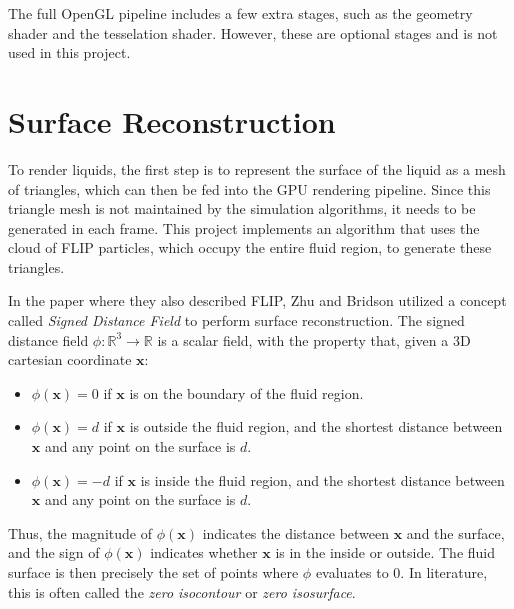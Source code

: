 The full OpenGL pipeline includes a few extra stages, such as the geometry shader and the tesselation shader. However, these are optional stages and is not used in this project. 


\section{Surface Reconstruction}
\label{section surface reconstruction}
To render liquids, the first step is to represent the surface of the liquid as a mesh of triangles, which can then be fed into the GPU rendering pipeline. Since this triangle mesh is not maintained by the simulation algorithms, it needs to be generated in each frame. This project implements an algorithm that uses the cloud of FLIP particles, which occupy the entire fluid region, to generate these triangles.

In the paper where they also described FLIP\cite{zhu2005animating}, Zhu and Bridson utilized a concept called \textit{Signed Distance Field} to perform surface reconstruction. The signed distance field $\phi : \mathbb{R} ^3 \rightarrow \mathbb{R}$  is a scalar field, with the property that, given a 3D cartesian coordinate $\textbf{x}$:
\begin{itemize}
    \item $\phi(\textbf{x}) = 0$ if $\textbf{x}$ is on the boundary of the fluid region.
    
    \item $\phi(\textbf{x}) = d$ if $\textbf{x}$ is outside the fluid region, and the shortest distance between $\textbf{x}$ and any point on the surface is $d$.
    
    \item $\phi(\textbf{x}) = -d$ if $\textbf{x}$ is inside the fluid region, and the shortest distance between $\textbf{x}$ and any point on the surface is $d$.
\end{itemize}
Thus, the magnitude of $\phi(\textbf{x})$ indicates the distance between $\textbf{x}$ and the surface, and the sign of $\phi(\textbf{x})$ indicates whether $\textbf{x}$ is in the inside or outside. The fluid surface is then precisely the set of points where $\phi$ evaluates to 0. In literature, this is often called the \textit{zero isocontour} or \textit{zero isosurface}.

